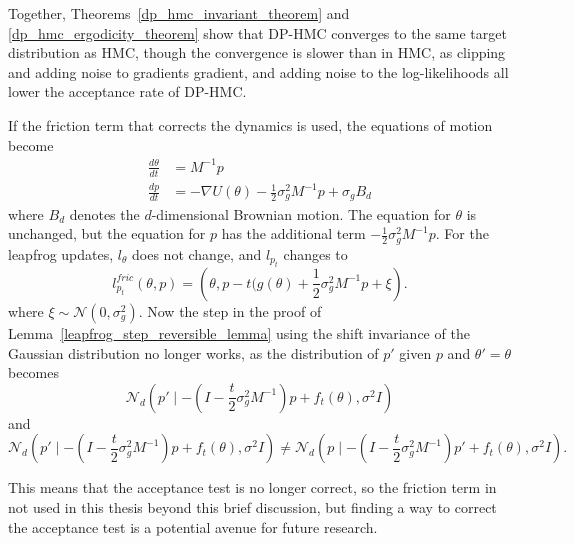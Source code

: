 \documentclass[english,twoside,openright]{HYgraduMLDS}
\newcommand{\caln}{{\mathcal{N}}}
\begin{document}
Together, Theorems~\ref{dp_hmc_invariant_theorem} and \ref{dp_hmc_ergodicity_theorem}
show that DP-HMC converges to the same target distribution as HMC, though
the convergence is slower than in HMC, as clipping and adding noise to
gradients gradient, and adding noise to the log-likelihoods all lower the
acceptance rate of DP-HMC.

If the friction term that corrects the dynamics is used, the equations of
motion become~\cite{CFG14}
\begin{align*}
  \frac{d\theta}{dt} &= M^{-1}p \\
  \frac{dp}{dt} &= -\nabla U(\theta) - \frac{1}{2}\sigma_{g}^{2}M^{-1}p + \sigma_{g}B_{d}
\end{align*}
where \(B_{d}\) denotes the \(d\)-dimensional Brownian motion.
The equation for \(\theta\) is unchanged, but the equation for \(p\) has the
additional term \(-\frac{1}{2}\sigma_{g}^{2}M^{-1}p\).
For the leapfrog updates, \(l_{\theta}\) does not change, and \(l_{p_{t}}\) changes
to
\[
  l_{p_{t}}^{fric}(\theta, p) = \left(\theta, p - t(g(\theta)
  + \frac{1}{2}\sigma_{g}^{2}M^{-1}p + \xi\right).
\]
where \(\xi \sim \caln(0, \sigma_{g}^{2})\).
Now the step in the proof of Lemma~\ref{leapfrog_step_reversible_lemma}
using the shift invariance of the Gaussian distribution no longer works,
as the distribution of \(p'\) given \(p\) and \(\theta' = \theta\) becomes
\[
  \caln_{d}\left(p'\mid - \left(I - \frac{t}{2}\sigma_{g}^{2}M^{-1}\right)p
    + f_{t}(\theta), \sigma^{2}I\right)
\]
and
\[
  \caln_{d}\left(p'\mid - \left(I - \frac{t}{2}\sigma_{g}^{2}M^{-1}\right)p
    + f_{t}(\theta), \sigma^{2}I\right)
  \neq \caln_{d}\left(p\mid - \left(I - \frac{t}{2}\sigma_{g}^{2}M^{-1}\right)p'
    + f_{t}(\theta), \sigma^{2}I\right).
\]

This means that the acceptance test is no longer correct, so
the friction term in not used in this thesis beyond this brief discussion,
but finding a way to correct the acceptance test is a potential avenue for
future research.
\end{document}
